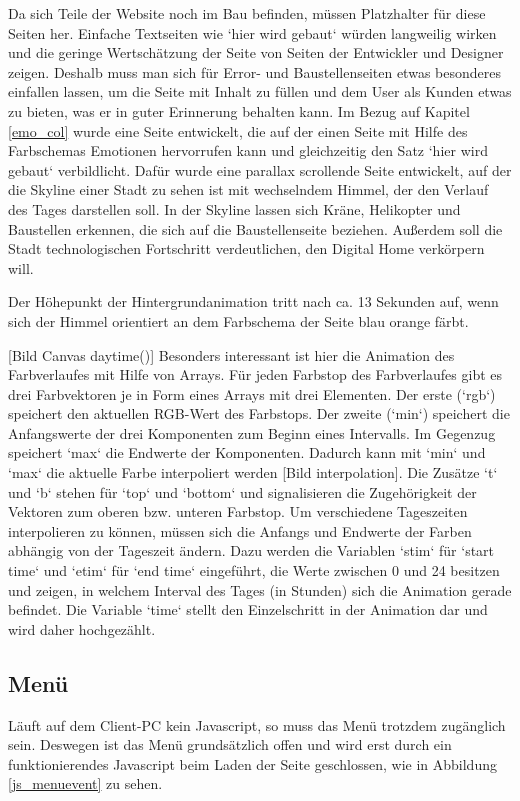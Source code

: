 Da sich Teile der Website noch im Bau befinden, müssen Platzhalter für diese Seiten her. Einfache Textseiten wie `hier wird gebaut` würden langweilig wirken und die geringe Wertschätzung der Seite von Seiten der Entwickler und Designer zeigen. Deshalb muss man sich für Error- und Baustellenseiten etwas besonderes einfallen lassen, um die Seite mit Inhalt zu füllen und dem User als Kunden etwas zu bieten, was er in guter Erinnerung behalten kann. Im Bezug auf Kapitel \ref{emo_col} wurde eine Seite entwickelt, die auf der einen Seite mit Hilfe des Farbschemas Emotionen hervorrufen kann und gleichzeitig den Satz `hier wird gebaut` verbildlicht. Dafür wurde eine parallax scrollende Seite entwickelt, auf der die Skyline einer Stadt zu sehen ist mit wechselndem Himmel, der den Verlauf des Tages darstellen soll. In der Skyline lassen sich Kräne, Helikopter und Baustellen erkennen, die sich auf die Baustellenseite beziehen. Außerdem soll die Stadt technologischen Fortschritt verdeutlichen, den Digital Home verkörpern will.

Der Höhepunkt der Hintergrundanimation tritt nach ca. 13 Sekunden auf, wenn sich der Himmel orientiert an dem Farbschema der Seite blau orange färbt.

[Bild Canvas daytime()]
Besonders interessant ist hier die Animation des Farbverlaufes mit Hilfe von Arrays. Für jeden Farbstop des Farbverlaufes gibt es drei Farbvektoren je in Form eines Arrays mit drei Elementen. Der erste (`rgb`) speichert den aktuellen RGB-Wert des Farbstops. Der zweite (`min`) speichert die Anfangswerte der drei Komponenten zum Beginn eines Intervalls. Im Gegenzug speichert `max` die Endwerte der Komponenten. Dadurch kann mit `min` und `max` die aktuelle Farbe interpoliert werden [Bild interpolation]. Die Zusätze `t` und `b` stehen für `top` und `bottom` und signalisieren die Zugehörigkeit der Vektoren zum oberen bzw. unteren Farbstop. 
Um verschiedene Tageszeiten interpolieren zu können, müssen sich die Anfangs und Endwerte der Farben abhängig von der Tageszeit ändern. Dazu werden die Variablen `stim` für `start time` und `etim` für `end time` eingeführt, die Werte zwischen 0 und 24 besitzen und zeigen, in welchem Interval des Tages (in Stunden) sich die Animation gerade befindet. Die Variable `time` stellt den Einzelschritt in der Animation dar und wird daher hochgezählt.

\subsection{Menü}
Läuft auf dem Client-PC kein Javascript, so muss das Menü trotzdem zugänglich sein. Deswegen ist das Menü grundsätzlich offen und wird erst durch ein funktionierendes Javascript beim Laden der Seite geschlossen, wie in Abbildung \ref{js_menuevent} zu sehen.

